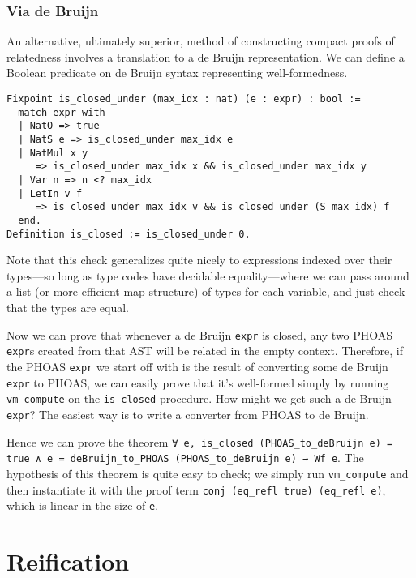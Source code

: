 
\subsubsection{Via de Bruijn} \label{sec:wf:perf:de-bruijn}

An alternative, ultimately superior, method of constructing compact proofs of relatedness involves a translation to a de Bruijn representation.
We can define a Boolean predicate on de Bruijn syntax representing well-formedness.
\begin{verbatim}
Fixpoint is_closed_under (max_idx : nat) (e : expr) : bool :=
  match expr with
  | NatO => true
  | NatS e => is_closed_under max_idx e
  | NatMul x y
     => is_closed_under max_idx x && is_closed_under max_idx y
  | Var n => n <? max_idx
  | LetIn v f
     => is_closed_under max_idx v && is_closed_under (S max_idx) f
  end.
Definition is_closed := is_closed_under 0.
\end{verbatim}
Note that this check generalizes quite nicely to expressions indexed over their types---so long as type codes have decidable equality---where we can pass around a list (or more efficient map structure) of types for each variable, and just check that the types are equal.

Now we can prove that whenever a de Bruijn \texttt{expr} is closed, any two PHOAS \texttt{expr}s created from that AST will be related in the empty context.
Therefore, if the PHOAS \texttt{expr} we start off with is the result of converting some de Bruijn \texttt{expr} to PHOAS, we can easily prove that it's well-formed simply by running \texttt{vm_compute} on the \texttt{is_closed} procedure.
How might we get such a de Bruijn \texttt{expr}?
The easiest way is to write a converter from PHOAS to de Bruijn.

Hence we can prove the theorem \texttt{∀ e, is\_closed (PHOAS\_to\_deBruijn e) = true ∧ e = deBruijn\_to\_PHOAS (PHOAS\_to\_deBruijn e) → Wf e}.
The hypothesis of this theorem is quite easy to check; we simply run \texttt{vm_compute} and then instantiate it with the proof term \texttt{conj (eq_refl true) (eq_refl e)}, which is linear in the size of \texttt{e}.

\section{Reification}\label{sec:reif-survey}\label{sec:reif-intro}

